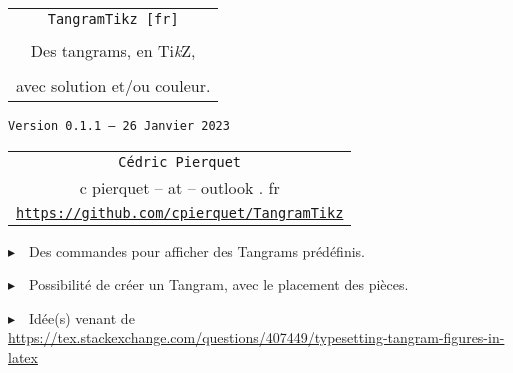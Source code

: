 \documentclass{article}
\def\TPversion{0.1.1}
\def\TPdate{26 Janvier 2023}
\begin{document}
\pagestyle{fancy}

\thispagestyle{empty}

\vspace{2cm}

\begin{center}
	\begin{minipage}{0.75\linewidth}
	\begin{tcolorbox}[colframe=yellow,colback=yellow!15]
		\begin{center}
			\begin{tabular}{c}
				{\Huge \texttt{TangramTikz [fr]}}\\
				\\
				{\LARGE Des tangrams, en Ti\textit{k}Z}, \\
				\\
				{\LARGE avec solution et/ou couleur.} \\
			\end{tabular}
			
			\medskip
			
			{\small \texttt{Version \TPversion{} -- \TPdate}}
		\end{center}
	\end{tcolorbox}
\end{minipage}
\end{center}

\vspace{0.5cm}

\begin{center}
	\begin{tabular}{c}
	\texttt{Cédric Pierquet}\\
	{\ttfamily c pierquet -- at -- outlook . fr}\\
	\texttt{\url{https://github.com/cpierquet/TangramTikz}}
\end{tabular}
\end{center}

\vspace{0.5cm}

{$\blacktriangleright$~~Des commandes pour afficher des Tangrams prédéfinis.}

\smallskip

{$\blacktriangleright$~~Possibilité de créer un Tangram, avec le placement des pièces.}

\smallskip

{$\blacktriangleright$~~Idée(s) venant de \url{https://tex.stackexchange.com/questions/407449/typesetting-tangram-figures-in-latex}}

\vspace{1cm}
\end{document}

